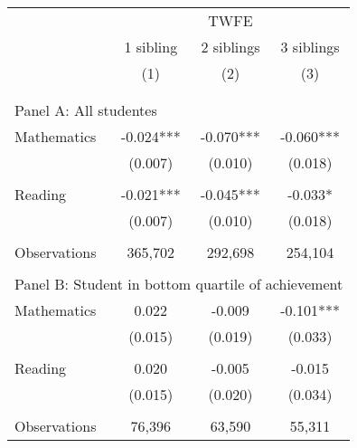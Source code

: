 \makeatletter
{}
{
\makeatother
\begin{tabular}{lccc}
\toprule
\cmidrule(lr){2-4}
& \multicolumn{3}{c}{TWFE} \\
\cmidrule(lr){2-4}
& 1 sibling & 2 siblings & 3 siblings  \\
\cmidrule(lr){2-2} \cmidrule(lr){3-3} \cmidrule(lr){4-4}
& (1) & (2) & (3)\\
\bottomrule
&  &  &  \\
&  &  &   \\
\multicolumn{4}{l}{Panel A: All studentes } \\
\hspace{3mm}Mathematics&      -0.024***&      -0.070***&      -0.060***\\
                    &     (0.007)   &     (0.010)   &     (0.018)   \\
 
&  &  &   \\
\hspace{3mm}Reading &      -0.021***&      -0.045***&      -0.033*  \\
                    &     (0.007)   &     (0.010)   &     (0.018)   \\
                    &               &               &               \\
\hspace{3mm}Observations&     365,702   &     292,698   &     254,104   \\
 
&  &  &   \\
\multicolumn{4}{l}{Panel B: Student in bottom quartile of achievement} \\
\hspace{3mm}Mathematics&       0.022   &      -0.009   &      -0.101***\\
                    &     (0.015)   &     (0.019)   &     (0.033)   \\
 
&  &  &   \\
\hspace{3mm}Reading &       0.020   &      -0.005   &      -0.015   \\
                    &     (0.015)   &     (0.020)   &     (0.034)   \\
                    &               &               &               \\
\hspace{3mm}Observations&      76,396   &      63,590   &      55,311   \\
 

\end{tabular}}

